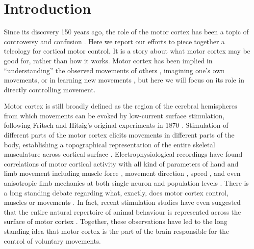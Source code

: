 \section{Introduction}

Since its discovery 150 years ago, the role of the motor cortex has been a topic of controversy and confusion \cite{Lashley1924}. Here we report our efforts to piece together a teleology for cortical motor control. It is a story about what motor cortex may be good for, rather than how it works. Motor cortex has been implied in ``understanding'' the observed movements of others \cite{Rizzolatti2004}, imagining one's own movements, or in learning new movements \cite{Kawai2015}, but here we will focus on its role in directly controlling movement.

Motor cortex is still broadly defined as the region of the cerebral hemispheres from which movements can be evoked by low-current surface stimulation, following Fritsch and Hitzig's original experiments in 1870 \cite{Fritsch1870}. Stimulation of different parts of the motor cortex elicits movements in different parts of the body, establishing a topographical representation of the entire skeletal musculature across cortical surface \cite{Leyton1917,Penfield1937,Neafsey1986}. Electrophysiological recordings have found correlations of motor cortical activity with all kind of parameters of hand and limb movement including muscle force \cite{Evarts1968}, movement direction \cite{Georgopoulos1986}, speed \cite{Schwartz1993} , and even anisotropic limb mechanics \cite{Scott2001} at both single neuron \cite{Evarts1968,Churchland2007} and population levels \cite{Georgopoulos1986,Churchland2012}. There is a long standing debate regarding what, exactly, does motor cortex control, muscles or movements \cite{Todorov2000}. In fact, recent stimulation studies have even suggested that the entire natural repertoire of animal behaviour is represented across the surface of motor cortex \cite{Graziano2002,Aflalo2006}. Together, these observations have led to the long standing idea that motor cortex is the part of the brain responsible for the control of voluntary movements.

